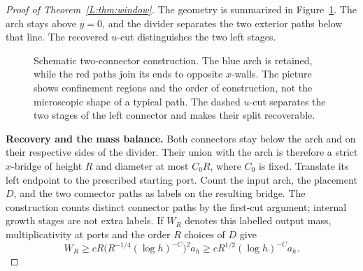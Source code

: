 \documentclass[11pt]{article}
\numberwithin{equation}{section}
\theoremstyle{definition}\newtheorem{definition}[theorem]{Definition}
\theoremstyle{remark}\newtheorem{remark}[theorem]{Remark}
\begin{document}
\begin{proof}[Proof of Theorem~\ref{L:thm:window}]
The geometry is summarized in Figure~\ref{L:fig:connectors}. The arch
stays above $y=0$, and the divider separates the two exterior paths below
that line. The recovered $u$-cut distinguishes the two left stages.
\begin{figure}[htbp]
\centering{}

\caption{Schematic two-connector construction. The blue arch is retained,
while the red paths join its ends to opposite $x$-walls. The picture shows
confinement regions and the order of construction, not the microscopic
shape of a typical path. The dashed $u$-cut separates the two stages of the left connector
and makes their split recoverable.}\label{L:fig:connectors}
\end{figure}


\medskip\noindent\textbf{Recovery and the mass balance.}
Both connectors stay below the arch and on their respective sides of
the divider. Their union with the arch is therefore a strict $x$-bridge
of height $R$ and diameter at most $C_0R$, where $C_0$ is fixed.
Translate its left endpoint to the prescribed starting port. Count the input arch, the placement $D$,
and the two connector paths as labels on the resulting bridge. The
construction counts distinct connector paths by the first-cut argument;
internal growth stages are not extra labels.
If $W_R$ denotes this labelled output mass, multiplicativity at ports
and the order $R$ choices of $D$ give
\begin{equation}
 W_R\ge cR\bigl(R^{-1/4}(\log h)^{-C}\bigr)^2a_h
       \ge cR^{1/2}(\log h)^{-C}a_h.
 \label{L:eq:connector-labelled-mass}
\end{equation}


\end{proof}
\end{document}
